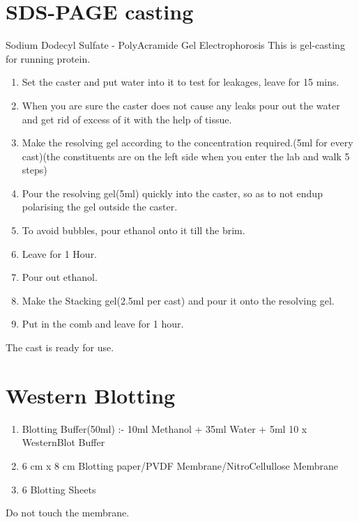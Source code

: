 \documentclass[11pt,twoside,a4paper]{article}
\begin{document}
\section{SDS-PAGE casting}
Sodium Dodecyl Sulfate - PolyAcramide Gel Electrophorosis
This is gel-casting for running protein.
\begin{enumerate}
	\item Set the caster and put water into it to test for leakages, leave for 15 mins.
	\item When you are sure the caster does not cause any leaks pour out the water and get rid of excess of it with the help of tissue.
	\item Make the resolving gel according to the concentration required.(5ml for every cast)(the constituents are on the left side when you enter the lab and walk 5 steps)
	\item Pour the resolving gel(5ml) quickly into the caster, so as to not endup polarising the gel outside the caster.
	\item To avoid bubbles, pour ethanol onto it till the brim.
	\item Leave for 1 Hour.
	\item Pour out ethanol.
	\item Make the Stacking gel(2.5ml per cast) and pour it onto the resolving gel.
	\item Put in the comb and leave for 1 hour.
\end{enumerate}
The cast is ready for use.

\section{Western Blotting}
\begin{enumerate}
	\item Blotting Buffer(50ml) :- 10ml Methanol +  35ml Water + 5ml 10 x WesternBlot Buffer
	\item 6 cm x 8 cm Blotting paper/PVDF Membrane/NitroCellullose Membrane
	\item 6 Blotting Sheets
\end{enumerate}
Do not touch the membrane.
\end{document}
